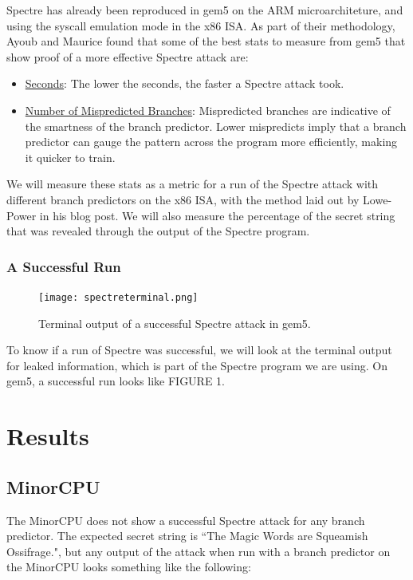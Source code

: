 \documentclass[twocolumn,showpacs,%
  nofootinbib,aps,superscriptaddress,%
  eqsecnum,prd,notitlepage,showkeys,10pt]{revtex4-1}
\begin{document}
Spectre has already been reproduced in gem5 on the ARM microarchiteture\cite{10.1145/3447852.3458715}, and using the syscall emulation mode in the x86 ISA\cite{jasonspectre}. As part of their methodology, Ayoub and Maurice found that some of the best stats to measure from gem5 that show proof of a more effective Spectre attack are:

\begin{itemize}
  \item \underline{Seconds}: The lower the seconds, the faster a Spectre attack took.
  \item \underline{Number of Mispredicted Branches}: Mispredicted branches are indicative of the smartness of the branch predictor. Lower mispredicts imply that a branch predictor can gauge the pattern across the program more efficiently, making it quicker to train.
\end{itemize}

We will measure these stats as a metric for a run of the Spectre attack\cite{SPECTREPRog} with different branch predictors on the x86 ISA, with the method laid out by Lowe-Power in his blog post\cite{jasonspectre}. We will also measure the percentage of the secret string that was revealed through the output of the Spectre program.

\subsubsection{A Successful Run}
\begin{figure}
    \centering
    \texttt{[image: spectreterminal.png]}
    \caption{Terminal output of a successful Spectre attack in gem5.}
\end{figure}

To know if a run of Spectre was successful, we will look at the terminal output for leaked information, which is part of the Spectre program we are using. On gem5, a successful run looks like FIGURE 1.



\section{Results}

\subsection{MinorCPU}

The MinorCPU does not show a successful Spectre attack for any branch predictor. The expected secret string is ``The Magic Words are Squeamish Ossifrage.", but any output of the attack when run with a branch predictor on the MinorCPU looks something like the following:
\end{document}
